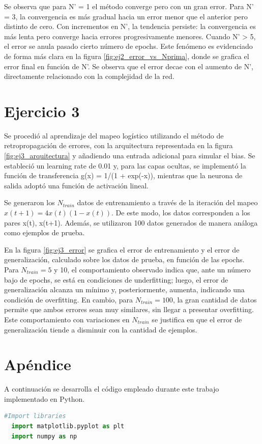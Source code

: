 \documentclass[aps,prb,twocolumn,superscriptaddress,floatfix,longbibliography]{revtex4-2}
\newcounter{para}
\begin{document}
Se observa que para N' = 1 el método converge pero con un gran error. Para N' = 3, la convergencia es más gradual hacia un error menor que el anterior pero distinto de cero. Con incrementos en N', la tendencia persiste: la convergencia es más lenta pero converge hacia errores progresivamente menores. Cuando N’ > 5, el error se anula pasado cierto número de epochs. Este fenómeno es evidenciado de forma más clara en la figura \ref{fig:ej2_error_vs_Nprima}, donde se grafica el error final en función de N'. Se observa que el error decae con el aumento de N', directamente relacionado con la complejidad de la red.



\section*{Ejercicio 3}

Se procedió al aprendizaje del mapeo logístico utilizando el método de retropropagación de errores, con la arquitectura representada en la figura \ref{fig:ej3_arquitectura} y añadiendo una entrada adicional para simular el bias. Se estableció un learning rate de 0.01 y, para las capas ocultas, se implementó la función de transferencia g(x) = 1/(1 + exp(-x)), mientras que la neurona de salida adoptó una función de activación lineal.

Se generaron los \(N_{train}\) datos de entrenamiento a través de la iteración del mapeo \(x(t + 1) = 4x(t)(1-x(t))\). De este modo, los datos corresponden a los pares {x(t), x(t+1)}. Además, se utilizaron 100 datos generados de manera análoga como ejemplos de prueba.



En la figura \ref{fig:ej3_error} se grafica el error de entrenamiento y el error de generalización, calculado sobre los datos de prueba, en función de las epochs. Para \(N_{train} = 5\) y 10, el comportamiento observado indica que, ante un número bajo de epochs, se está en condiciones de underfitting; luego, el error de generalización alcanza un mínimo y, posteriormente, aumenta, indicando una condición de overfitting. En cambio, para \(N_{train} = 100\), la gran cantidad de datos permite que ambos errores sean muy similares, sin llegar a presentar overfitting. Este comportamiento con variaciones en \(N_{train}\) se justifica en que el error de generalización tiende a disminuir con la cantidad de ejemplos.



\onecolumngrid

\section{Apéndice}
A continuación se desarrolla el código empleado durante este trabajo implementado en Python.




\begin{lstlisting}[language=Python]
  #Import libraries
  import matplotlib.pyplot as plt
  import numpy as np
  

\end{lstlisting}


\end{document}
